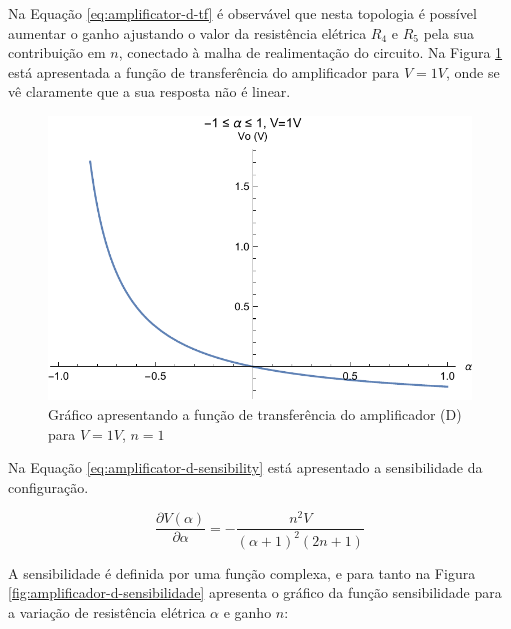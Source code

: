 \documentclass[a4paper]{instrumentacao}
\begin{document}
Na Equação \ref{eq:amplificator-d-tf} é observável que nesta topologia é possível aumentar o ganho ajustando o valor da resistência elétrica $R_4$ e $R_5$ pela sua contribuição em $n$, conectado à malha de realimentação do circuito. Na Figura \ref{fig:amplificador-d-tf} está apresentada a função de transferência do amplificador para $V=1V$, onde se vê claramente que a sua resposta não é linear.

\begin{figure}[H]
\center
\includegraphics[width=\textwidth]{Amplificador-D-TF.pdf}
\caption{Gráfico apresentando a função de transferência do amplificador (D) para $V=1V$, $n=1$}
\label{fig:amplificador-d-tf}
\end{figure}

Na Equação \ref{eq:amplificator-d-sensibility} está apresentado a sensibilidade da configuração.

\begin{equation}
	\frac{\partial V(\alpha)}{\partial \alpha} = -\frac{n^2 V}{(\alpha +1)^2 (2 n+1)}
	\label{eq:amplificator-d-sensibility}
\end{equation}

A sensibilidade é definida por uma função complexa, e para tanto na Figura  \ref{fig:amplificador-d-sensibilidade} apresenta o gráfico da função sensibilidade para a variação de resistência elétrica $\alpha$ e ganho $n$:
\end{document}
